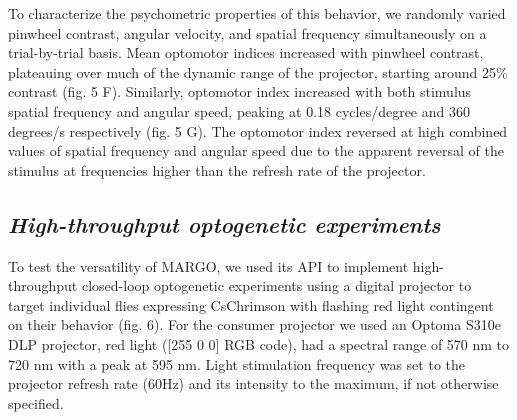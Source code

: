 \documentclass[10pt]{article}
\begin{document}
\begin{multicols}{2}
To characterize the psychometric properties of this behavior, we randomly varied pinwheel contrast, angular velocity, and spatial frequency simultaneously on a trial-by-trial basis. Mean optomotor indices increased with pinwheel contrast, plateauing over much of the dynamic range of the projector, starting around 25\% contrast (fig. 5 F). Similarly, optomotor index increased with both stimulus spatial frequency and angular speed, peaking at 0.18 cycles/degree and 360 degrees/s respectively (fig. 5 G). The optomotor index reversed at high combined values of spatial frequency and angular speed due to the apparent reversal of the stimulus at frequencies higher than the refresh rate of the projector.

\subsection*{\textit{High-throughput optogenetic experiments}}

To test the versatility of MARGO, we used its API to implement high-throughput closed-loop optogenetic experiments using a digital projector to target individual flies expressing CsChrimson \cite{griebel_2014,Klapoetke_Independent_2014} with flashing red light contingent on their behavior (fig. 6). For the consumer projector we used an Optoma S310e DLP projector, red light ([255 0 0] RGB code), had a spectral range of 570 nm to 720 nm with a peak at 595 nm. Light stimulation frequency was set to the projector refresh rate (60Hz) and its intensity to the maximum, if not otherwise specified.


\end{multicols}
\end{document}
